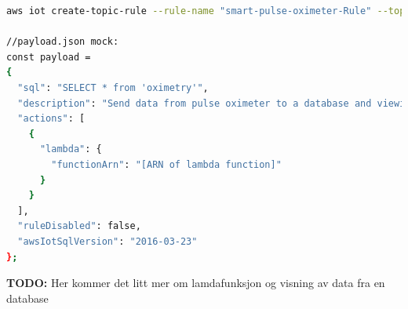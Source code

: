 \begin{lstlisting}[frame=single, language=bash, caption=Sette opp en businessregel i AWS IoT, label=lst:aws_business]
aws iot create-topic-rule --rule-name "smart-pulse-oximeter-Rule" --topic-rule-payload "file://payload.json"

//payload.json mock:
const payload =
{
  "sql": "SELECT * from 'oximetry'",
  "description": "Send data from pulse oximeter to a database and viewing tool",
  "actions": [
    {
      "lambda": {
        "functionArn": "[ARN of lambda function]"
      }
    }
  ],
  "ruleDisabled": false,
  "awsIotSqlVersion": "2016-03-23"
};
\end{lstlisting}

\textbf{TODO:} Her kommer det litt mer om lamdafunksjon og visning av data fra en database
